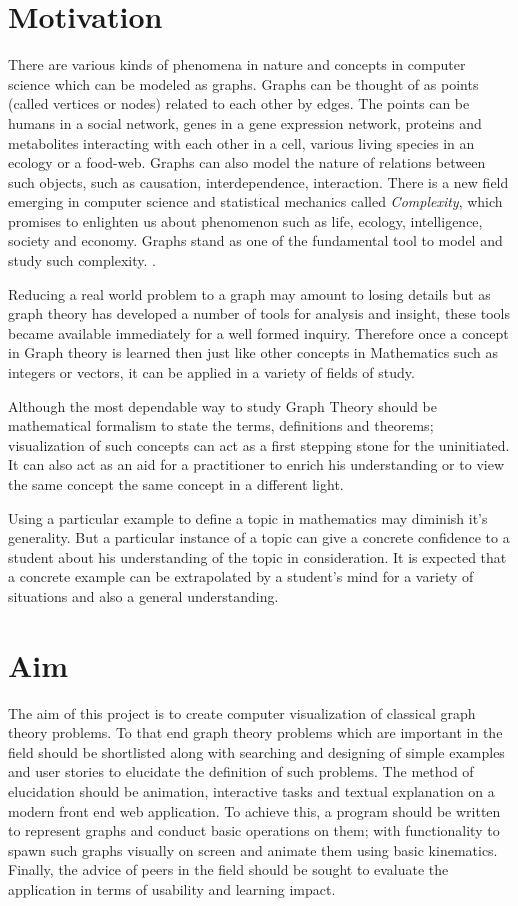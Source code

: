 
\section{Motivation}
There are various kinds of phenomena in nature and concepts in computer science which can
be modeled as graphs. Graphs can be thought of as points (called vertices or
nodes) related to each other by edges. The points can be humans in a social
network, genes in a gene expression network, proteins and metabolites
interacting with each other in a cell, various living species in an ecology or
a food-web. Graphs can also model the nature of relations between such objects, such as causation,
interdependence, interaction.  There is a new field emerging in computer science
and statistical mechanics called \emph{Complexity}, which promises to enlighten
us about phenomenon such as life, ecology, intelligence, society and economy.
Graphs stand as one of the fundamental tool to model and study such complexity. \cite{Gros2015}.

Reducing a real world problem to a graph may amount to losing details but as
graph theory has developed a number of tools for analysis and insight, these
tools became available immediately for a well formed inquiry. Therefore once a
concept in Graph theory is learned then just like other concepts in Mathematics
such as integers or vectors, it can be applied in a variety of fields of
study.

Although the most dependable way to study Graph Theory should be mathematical
formalism to state the terms, definitions and theorems; visualization of such
concepts can act as a first stepping stone for the uninitiated. It can also act
as an aid for a practitioner to enrich his understanding or to view the same
concept the same concept in a different light.

Using a particular example to define a topic in mathematics may diminish it's
generality. But a particular instance of a topic can give a concrete confidence
to a student about his understanding of the topic in consideration. It is
expected that a concrete example can be extrapolated by a student's mind for a
variety of situations and also a general understanding.

\section{Aim}
The aim of this project is to create computer visualization of classical graph
theory problems. To that end graph theory problems which are important in the
field should be shortlisted along with searching and designing of simple
examples and user stories to elucidate the definition of such problems.
The method of elucidation should be animation, interactive tasks and textual
explanation on a modern front end web application. To achieve this, a program
should be written to represent graphs and conduct basic operations on them;
with functionality to spawn such graphs visually on screen and
animate them using basic kinematics. Finally, the advice of peers in the field should be sought to evaluate the
application in terms of usability and learning impact.

